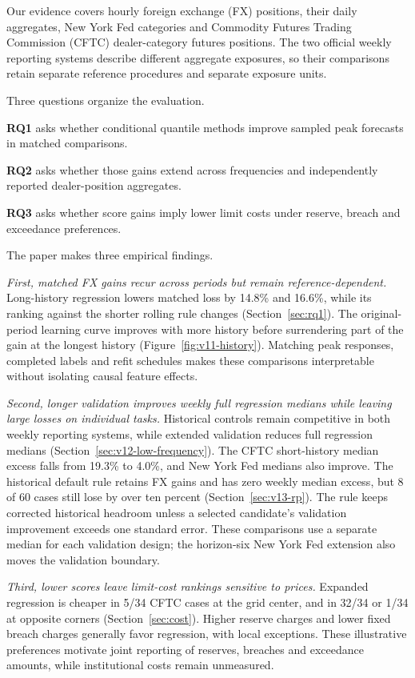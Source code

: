 \documentclass[12pt,a4paper]{article}
\begin{document}
Our evidence covers hourly foreign exchange (FX) positions, their daily aggregates, New York Fed categories and Commodity Futures Trading Commission (CFTC) dealer-category futures positions. The two official weekly reporting systems describe different aggregate exposures, so their comparisons retain separate reference procedures and separate exposure units.

Three questions organize the evaluation.

\textbf{RQ1} asks whether conditional quantile methods improve sampled peak forecasts in matched comparisons.

\textbf{RQ2} asks whether those gains extend across frequencies and independently reported dealer-position aggregates.

\textbf{RQ3} asks whether score gains imply lower limit costs under reserve, breach and exceedance preferences.

The paper makes three empirical findings.

\textit{First, matched FX gains recur across periods but remain reference-dependent.} Long-history regression lowers matched loss by 14.8\% and 16.6\%, while its ranking against the shorter rolling rule changes (Section~\ref{sec:rq1}). The original-period learning curve improves with more history before surrendering part of the gain at the longest history (Figure~\ref{fig:v11-history}). Matching peak responses, completed labels and refit schedules makes these comparisons interpretable without isolating causal feature effects.

\textit{Second, longer validation improves weekly full regression medians while leaving large losses on individual tasks.} Historical controls remain competitive in both weekly reporting systems, while extended validation reduces full regression medians (Section~\ref{sec:v12-low-frequency}). The CFTC short-history median excess falls from 19.3\% to 4.0\%, and New York Fed medians also improve. The historical default rule retains FX gains and has zero weekly median excess, but 8 of 60 cases still lose by over ten percent (Section~\ref{sec:v13-rp}). The rule keeps corrected historical headroom unless a selected candidate's validation improvement exceeds one standard error. These comparisons use a separate median for each validation design; the horizon-six New York Fed extension also moves the validation boundary.

\textit{Third, lower scores leave limit-cost rankings sensitive to prices.} Expanded regression is cheaper in 5/34 CFTC cases at the grid center, and in 32/34 or 1/34 at opposite corners (Section~\ref{sec:cost}). Higher reserve charges and lower fixed breach charges generally favor regression, with local exceptions. These illustrative preferences motivate joint reporting of reserves, breaches and exceedance amounts, while institutional costs remain unmeasured.
\end{document}
